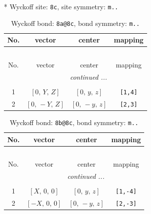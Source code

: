 \documentclass[fleqn,8pt]{jsarticle}
\begin{document}
* Wyckoff site: {\tt 8c}, site symmetry: {\tt m..}
\renewcommand{\arraystretch}{1.2}
\begin{longtable}{cccc}
\caption{Wyckoff bond: {\tt 8a@8c}, bond symmetry: {\tt m..}}
 \\
 \hline \hline
No. & vector & center & mapping \\ \hline \endfirsthead

\multicolumn{3}{l}{\tablename\ \thetable{}} \\
 \hline \hline
No. & vector & center & mapping \\ \hline \endhead

 \hline \hline
\multicolumn{3}{r}{\footnotesize\it continued ...} \\ \endfoot

 \hline \hline
\multicolumn{3}{r}{} \\ \endlastfoot

1 & $\left[ 0,\, Y,\, Z \right]$ & $\left[ 0,\, y,\, z \right]$ & {\tt [1,4]} \\ \hline
2 & $\left[ 0,\, - Y,\, Z \right]$ & $\left[ 0,\, - y,\, z \right]$ & {\tt [2,3]} \\
\end{longtable}
\renewcommand{\arraystretch}{1.2}
\begin{longtable}{cccc}
\caption{Wyckoff bond: {\tt 8b@8c}, bond symmetry: {\tt m..}}
 \\
 \hline \hline
No. & vector & center & mapping \\ \hline \endfirsthead

\multicolumn{3}{l}{\tablename\ \thetable{}} \\
 \hline \hline
No. & vector & center & mapping \\ \hline \endhead

 \hline \hline
\multicolumn{3}{r}{\footnotesize\it continued ...} \\ \endfoot

 \hline \hline
\multicolumn{3}{r}{} \\ \endlastfoot

1 & $\left[ X,\, 0,\, 0 \right]$ & $\left[ 0,\, y,\, z \right]$ & {\tt [1,-4]} \\ \hline
2 & $\left[ - X,\, 0,\, 0 \right]$ & $\left[ 0,\, - y,\, z \right]$ & {\tt [2,-3]} \\
\end{longtable}
\renewcommand{\arraystretch}{1.2}
\end{document}
